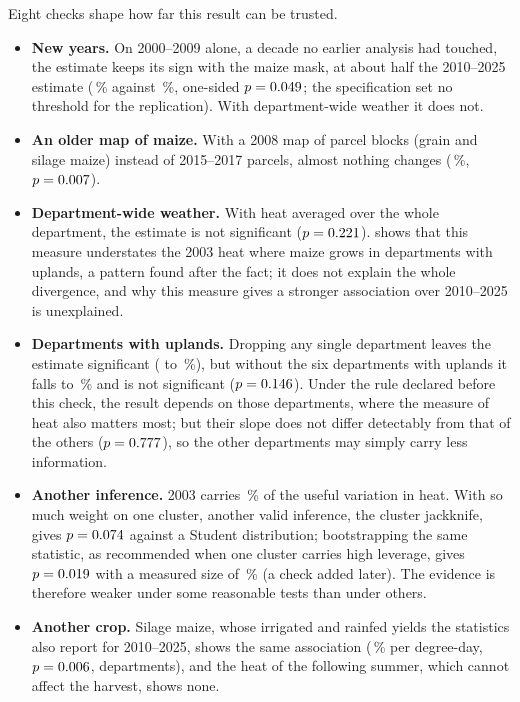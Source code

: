 Eight checks shape how far this result can be trusted.
\begin{itemize}
  \item \textbf{New years.} On 2000--2009 alone, a decade no earlier analysis had touched, the estimate keeps its sign with the maize mask, at about half the 2010--2025 estimate (\QoneReplPct\,\% against \QoneRecentPct\,\%, one-sided $p = 0.049$; the specification set no threshold for the replication). With department-wide weather it does not.
  \item \textbf{An older map of maize.} With a 2008 map of parcel blocks (grain and silage maize) instead of 2015--2017 parcels, almost nothing changes (\QoneMaskPct\,\%, $p = 0.007$).
  \item \textbf{Department-wide weather.} With heat averaged over the whole department, the estimate is not significant ($p = 0.221$).  shows that this measure understates the 2003 heat where maize grows in departments with uplands, a pattern found after the fact; it does not explain the whole divergence, and why this measure gives a stronger association over 2010--2025 is unexplained.
  \item \textbf{Departments with uplands.} Dropping any single department leaves the estimate significant (\LooMinPct{} to \LooMaxPct\,\%), but without the six departments with uplands it falls to \NoReliefPct\,\% and is not significant ($p = 0.146$). Under the rule declared before this check, the result depends on those departments, where the measure of heat also matters most; but their slope does not differ detectably from that of the others ($p = 0.777$), so the other departments may simply carry less information.
  \item \textbf{Another inference.} 2003 carries \LevThree\,\% of the useful variation in heat. With so much weight on one cluster, another valid inference, the cluster jackknife, gives $p = 0.074$ against a Student distribution; bootstrapping the same statistic, as recommended when one cluster carries high leverage, gives $p = 0.019$ with a measured size of \CvBootSize\,\% (a check added later). The evidence is therefore weaker under some reasonable tests than under others.
  \item \textbf{Another crop.} Silage maize, whose irrigated and rainfed yields the statistics also report for 2010--2025, shows the same association (\FodderPct\,\% per degree-day, $p = 0.006$, \FodderDeps{} departments), and the heat of the following summer, which cannot affect the harvest, shows none.

\end{itemize}
